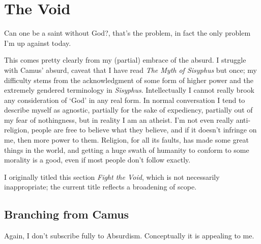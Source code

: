 \documentclass[../butidigress.tex]{subfiles}
\begin{document}
\chapter{The Void}  %
\epigraph{Can one be a saint without God?, that's the problem, in fact the only problem I'm up against today.}{}
\newpage
This comes pretty clearly from my (partial) embrace of the absurd.
I struggle with Camus' absurd, caveat that I have read \textit{The Myth of Sisyphus} but once; my difficulty stems from the acknowledgment of some form of higher power and the extremely gendered terminology in \textit{Sisyphus}.
Intellectually I cannot really brook any consideration of `God' in any real form.
In normal conversation I tend to describe myself as agnostic, partially for the sake of expediency, partially out of my fear of nothingness, but in reality I am an atheist.
I'm not even really anti-religion, people are free to believe what they believe, and if it doesn't infringe on me, then more power to them.
Religion, for all its faults, has made some great things in the world, and getting a huge swath of humanity to conform to some morality is a good, even if most people don't follow exactly.

I originally titled this section \textit{Fight the Void}, which is not necessarily inappropriate; the current title reflects a broadening of scope.

\section{Branching from Camus}
Again, I don't subscribe fully to Absurdism.
Conceptually it is appealing to me.
\end{document}
